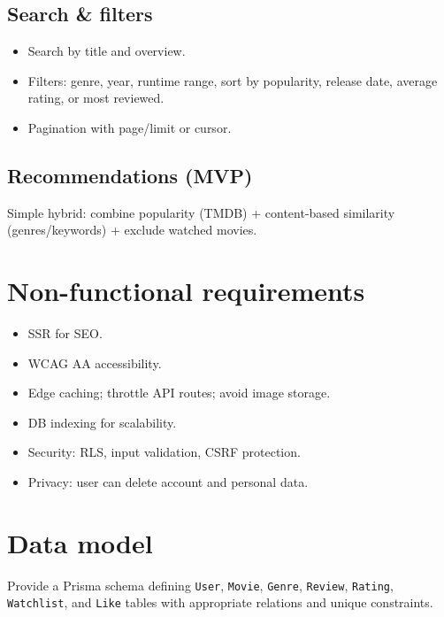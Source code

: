 \documentclass[11pt,a4paper]{article}
\begin{document}
\subsection{Search \& filters}
\begin{itemize}
  \item Search by title and overview.
  \item Filters: genre, year, runtime range, sort by popularity, release date, average rating, or most reviewed.
  \item Pagination with page/limit or cursor.
\end{itemize}

\subsection{Recommendations (MVP)}
Simple hybrid: combine popularity (TMDB) + content-based similarity (genres/keywords) + exclude watched movies.

\section{Non-functional requirements}
\begin{itemize}
  \item SSR for SEO.
  \item WCAG AA accessibility.
  \item Edge caching; throttle API routes; avoid image storage.
  \item DB indexing for scalability.
  \item Security: RLS, input validation, CSRF protection.
  \item Privacy: user can delete account and personal data.
\end{itemize}

\section{Data model}
Provide a Prisma schema defining \texttt{User}, \texttt{Movie}, \texttt{Genre}, \texttt{Review}, \texttt{Rating}, \texttt{Watchlist}, and \texttt{Like} tables with appropriate relations and unique constraints.
\end{document}
